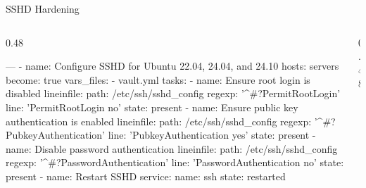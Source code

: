 \documentclass[aspectratio=169,12pt]{beamer}
\begin{document}
\begin{frame}[fragile]{SSHD Hardening}
\begin{columns}[T]
\begin{column}{0.48\textwidth}
\begin{codeyamlsmall}
---
- name: Configure SSHD for Ubuntu
    22.04, 24.04, and 24.10
  hosts: servers
  become: true
  vars_files:    - vault.yml  tasks:
    - name: Ensure root login is
        disabled
      lineinfile:
        path: /etc/ssh/sshd_config
        regexp: '^#?PermitRootLogin'
        line: 'PermitRootLogin no'
        state: present
    - name: Ensure public key
        authentication is enabled
      lineinfile:
        path: /etc/ssh/sshd_config
        regexp: '^#?PubkeyAuthentication'
        line: 'PubkeyAuthentication yes'
        state: present
    - name: Disable password
        authentication
      lineinfile:
        path: /etc/ssh/sshd_config
        regexp: '^#?PasswordAuthentication'
        line: 'PasswordAuthentication no'
        state: present
    - name: Restart SSHD
      service:
        name: ssh
        state: restarted
\end{codeyamlsmall}
\end{column}
\begin{column}{0.48\textwidth}
\end{column}
\end{columns}
\end{frame}
\end{document}
